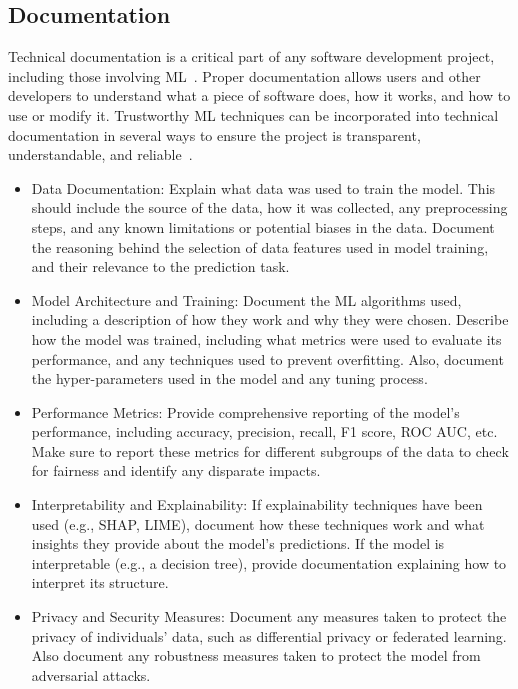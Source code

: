 \documentclass[a4paper,11pt]{article}
\begin{document}
\subsection{Documentation}

Technical documentation is a critical part of any software development project, including those involving ML~\cite{chang2022understanding, konigstorfer2021software}. Proper documentation allows users and other developers to understand what a piece of software does, how it works, and how to use or modify it. Trustworthy ML techniques can be incorporated into technical documentation in several ways to ensure the project is transparent, understandable, and reliable~\cite{piorkowski2020towards}.

\begin{itemize}
\item Data Documentation: Explain what data was used to train the model. This should include the source of the data, how it was collected, any preprocessing steps, and any known limitations or potential biases in the data. Document the reasoning behind the selection of data features used in model training, and their relevance to the prediction task.

\item Model Architecture and Training: Document the ML algorithms used, including a description of how they work and why they were chosen. Describe how the model was trained, including what metrics were used to evaluate its performance, and any techniques used to prevent overfitting. Also, document the hyper-parameters used in the model and any tuning process.

\item Performance Metrics: Provide comprehensive reporting of the model's performance, including accuracy, precision, recall, F1 score, ROC AUC, etc. Make sure to report these metrics for different subgroups of the data to check for fairness and identify any disparate impacts.

\item Interpretability and Explainability: If explainability techniques have been used (e.g., SHAP, LIME), document how these techniques work and what insights they provide about the model's predictions. If the model is interpretable (e.g., a decision tree), provide documentation explaining how to interpret its structure.

\item Privacy and Security Measures: Document any measures taken to protect the privacy of individuals' data, such as differential privacy or federated learning. Also document any robustness measures taken to protect the model from adversarial attacks.


\end{itemize}
\end{document}
